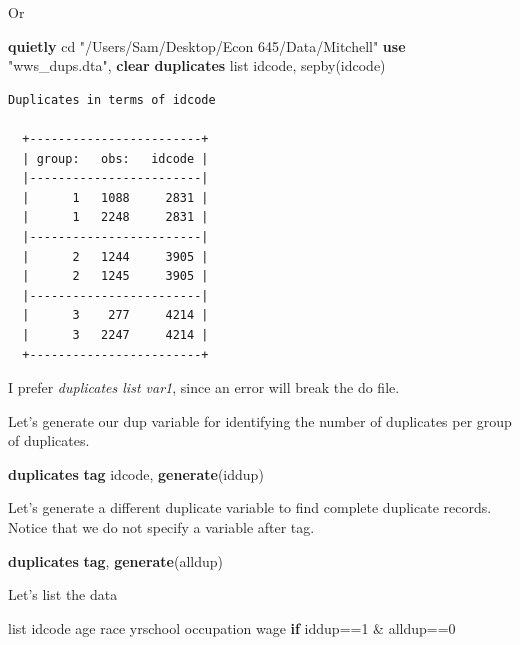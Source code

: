 \documentclass[
]{book}
\newenvironment{Shaded}{\begin{snugshade}}{\end{snugshade}}
\newcommand{\FunctionTok}[1]{\textcolor[rgb]{0.13,0.29,0.53}{\textbf{#1}}}
\newcommand{\KeywordTok}[1]{\textcolor[rgb]{0.13,0.29,0.53}{\textbf{#1}}}
\newcommand{\NormalTok}[1]{#1}
\newcommand{\OtherTok}[1]{\textcolor[rgb]{0.56,0.35,0.01}{#1}}
\newcommand{\StringTok}[1]{\textcolor[rgb]{0.31,0.60,0.02}{#1}}
\begin{document}
Or

\begin{Shaded}
\begin{Highlighting}[]
\KeywordTok{quietly}\NormalTok{ cd }\StringTok{"/Users/Sam/Desktop/Econ 645/Data/Mitchell"}
\KeywordTok{use} \StringTok{"wws\_dups.dta"}\NormalTok{, }\KeywordTok{clear}
\KeywordTok{duplicates} \OtherTok{list}\NormalTok{ idcode, sepby(idcode)}
\end{Highlighting}
\end{Shaded}

\begin{verbatim}
Duplicates in terms of idcode

  +------------------------+
  | group:   obs:   idcode |
  |------------------------|
  |      1   1088     2831 |
  |      1   2248     2831 |
  |------------------------|
  |      2   1244     3905 |
  |      2   1245     3905 |
  |------------------------|
  |      3    277     4214 |
  |      3   2247     4214 |
  +------------------------+
\end{verbatim}

I prefer \emph{duplicates list var1}, since an error will break the do file.

Let's generate our dup variable for identifying the number of duplicates per
group of duplicates.

\begin{Shaded}
\begin{Highlighting}[]
\KeywordTok{duplicates} \FunctionTok{tag}\NormalTok{ idcode, }\KeywordTok{generate}\NormalTok{(iddup)}
\end{Highlighting}
\end{Shaded}

Let's generate a different duplicate variable to find complete duplicate
records. Notice that we do not specify a variable after tag.

\begin{Shaded}
\begin{Highlighting}[]
\KeywordTok{duplicates} \FunctionTok{tag}\NormalTok{, }\KeywordTok{generate}\NormalTok{(alldup)}
\end{Highlighting}
\end{Shaded}

Let's list the data

\begin{Shaded}
\begin{Highlighting}[]
\OtherTok{list}\NormalTok{ idcode age race yrschool occupation wage }\KeywordTok{if}\NormalTok{ iddup==1 \& alldup==0}
\end{Highlighting}
\end{Shaded}
\end{document}

